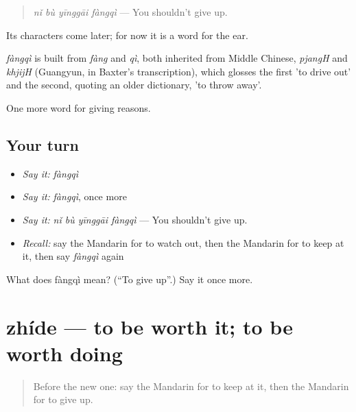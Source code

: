 \begin{quote}
\emph{nǐ bù yīnggāi fàngqì} — You shouldn't give up.
\end{quote}

Its characters come later; for now it is a word for the ear.

\begin{cousinweb}
\emph{fàngqì} is built from \emph{fàng} and \emph{qì}, both inherited from Middle Chinese, \emph{pjangH} and \emph{khjijH} (Guangyun, in Baxter's transcription), which glosses the first 'to drive out' and the second, quoting an older dictionary, 'to throw away'.
\end{cousinweb}

\begin{grammarlens}[title={What you've built}]
One more word for giving reasons.
\end{grammarlens}

\subsection*{Your turn}
\begin{itemize}
\raggedright
  \item \emph{Say it:} \emph{fàngqì}
  \item \emph{Say it:} \emph{fàngqì}, once more
  \item \emph{Say it:} \emph{nǐ bù yīnggāi fàngqì} — You shouldn't give up.
  \item \emph{Recall:} say the Mandarin for to watch out, then the Mandarin for to keep at it, then say \emph{fàngqì} again
\end{itemize}

\begin{tcolorbox}[breakable,colback=teal!4,colframe=teal!35!black,title={Before you move on}]
What does fàngqì mean? (\textquotedblleft{}To give up\textquotedblright{}.) Say it once more.
\end{tcolorbox}
\section[zhíde]{zhíde — to be worth it; to be worth doing}

\label{lesson:ZH-C366-zhide}



\begin{quote}
Before the new one: say the Mandarin for to keep at it, then the Mandarin for to give up.
\end{quote}

